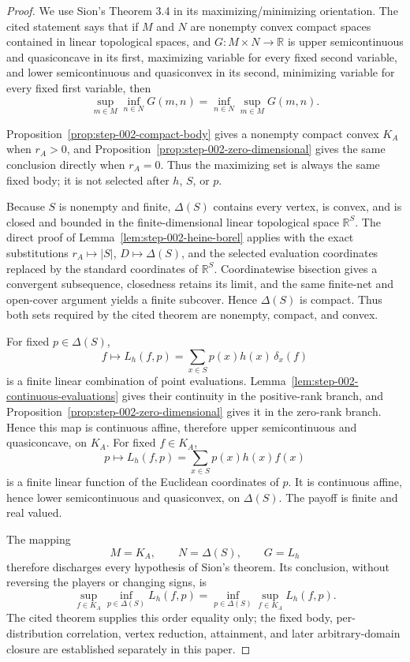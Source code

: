 \begin{proof}
We use Sion's Theorem 3.4 \citep[Theorem~3.4]{sion1958minimax} in its
maximizing/minimizing orientation.  The cited statement says that if \(M\)
and \(N\) are nonempty convex compact spaces contained in linear topological
spaces, and \(G:M\times N\to\mathbb R\) is upper semicontinuous and
quasiconcave in its first, maximizing variable for every fixed second
variable, and lower semicontinuous and quasiconvex in its second, minimizing
variable for every fixed first variable, then
\[
\sup_{m\in M}\inf_{n\in N}G(m,n)
=\inf_{n\in N}\sup_{m\in M}G(m,n).
\tag{A.1}
\]

Proposition~\ref{prop:step-002-compact-body} gives a nonempty compact convex
\(K_A\) when \(r_A>0\), and
Proposition~\ref{prop:step-002-zero-dimensional} gives the same conclusion
directly when \(r_A=0\).  Thus the maximizing set is always the same fixed
body; it is not selected after \(h\), \(S\), or \(p\).

Because \(S\) is nonempty and finite, \(\Delta(S)\) contains every vertex,
is convex, and is closed and bounded in the finite-dimensional linear
topological space \(\mathbb R^S\).  The direct proof of
Lemma~\ref{lem:step-002-heine-borel} applies with the exact substitutions
\(r_A\mapsto |S|\), \(D\mapsto\Delta(S)\), and the selected evaluation
coordinates replaced by the standard coordinates of \(\mathbb R^S\).
Coordinatewise bisection gives a convergent subsequence, closedness retains
its limit, and the same finite-net and open-cover argument yields a finite
subcover.  Hence \(\Delta(S)\) is compact.  Thus both sets required by the
cited theorem are nonempty, compact, and convex.

For fixed \(p\in\Delta(S)\),
\[
f\longmapsto L_h(f,p)
=\sum_{x\in S}p(x)h(x)\,\delta_x(f)
\]
is a finite linear combination of point evaluations.
Lemma~\ref{lem:step-002-continuous-evaluations} gives their continuity in the
positive-rank branch, and
Proposition~\ref{prop:step-002-zero-dimensional} gives it in the zero-rank
branch.  Hence this map is continuous affine, therefore upper semicontinuous
and quasiconcave, on \(K_A\).  For fixed \(f\in K_A\),
\[
p\longmapsto L_h(f,p)
=\sum_{x\in S}p(x)h(x)f(x)
\]
is a finite linear function of the Euclidean coordinates of \(p\).  It is
continuous affine, hence lower semicontinuous and quasiconvex, on
\(\Delta(S)\).  The payoff is finite and real valued.

The mapping
\[
M=K_A,\qquad N=\Delta(S),\qquad G=L_h
\]
therefore discharges every hypothesis of Sion's theorem.  Its conclusion,
without reversing the players or changing signs, is
\[
\sup_{f\in K_A}\inf_{p\in\Delta(S)}L_h(f,p)
=\inf_{p\in\Delta(S)}\sup_{f\in K_A}L_h(f,p).
\tag{A.2}
\]
The cited theorem supplies this order equality only; the fixed body,
per-distribution correlation, vertex reduction, attainment, and later
arbitrary-domain closure are established separately in this paper.


\end{proof}
